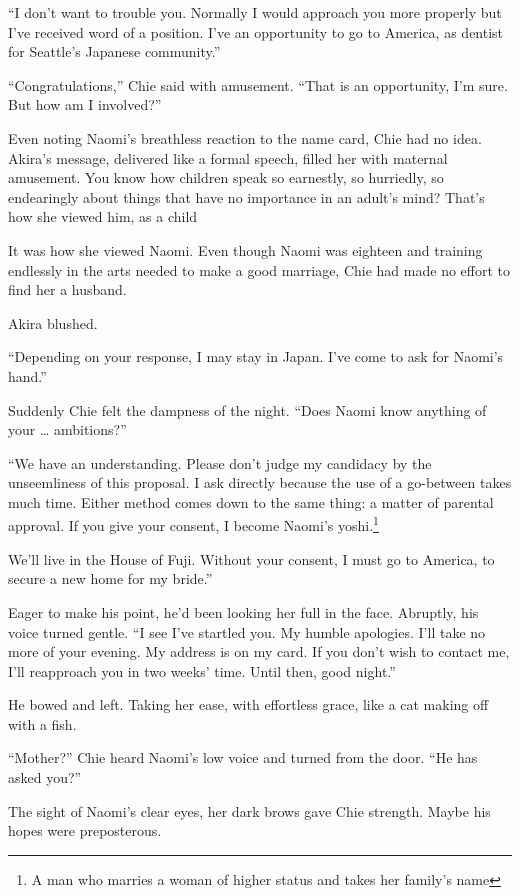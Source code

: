 {``I don't want to trouble you. 
Normally I would approach you more properly but I've received word of a position. 
I've an opportunity to go to America, as dentist for Seattle's Japanese community.''


``Congratulations,'' Chie said with amusement.
``That is an opportunity, I'm sure. But how am I involved?''


Even noting Naomi's breathless reaction to the name card, Chie had no idea. 
Akira's message, delivered like a formal speech, filled her with maternal amusement. 
You know how children speak so earnestly, so hurriedly, so endearingly about things that have no importance in an adult's mind?  
That's how she viewed him, as a child


It was how she viewed Naomi. 
Even though Naomi was eighteen and training endlessly in the arts needed to make a good marriage, Chie had made no effort to find her a husband.


Akira blushed.

``Depending on your response, I may stay in Japan. 
I've come to ask for Naomi's hand.''


Suddenly Chie felt the dampness of the night.
``Does Naomi know anything of your \ldots{} ambitions?''


``We have an understanding. 
Please don't judge my candidacy by the unseemliness of this proposal. 
I ask directly because the use of a go-between takes much time. 
Either method comes down to the same thing: a matter of parental approval. 
If you give your consent, I become Naomi's yoshi.\footnote{A man who marries a woman of higher status and takes her family's name}

We'll live in the House of Fuji. 
Without your consent, I must go to America, to secure a new home for my bride.''


Eager to make his point, he'd been looking her full in the face. 
Abruptly, his voice turned gentle.
``I see I've startled you. My humble apologies. 
I'll take no more of your evening. 
My address is on my card. 
If you don't wish to contact me, I'll reapproach you in two weeks' time. 
Until then, good night.''


He bowed and left. 
Taking her ease, with effortless grace, like a cat making off with a fish.


``Mother?'' Chie heard Naomi's low voice and turned from the door. 
``He has asked you?''

The sight of Naomi's clear eyes, her dark brows gave Chie strength. 
Maybe his hopes were preposterous.


}
